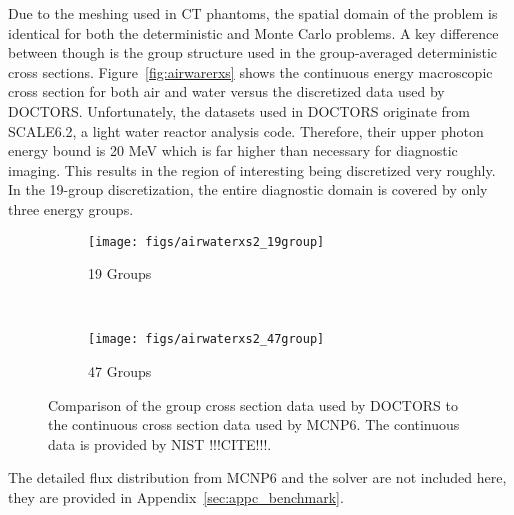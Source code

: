 Due to the meshing used in CT phantoms, the spatial domain of the problem is identical for both the deterministic and Monte Carlo problems. A key difference between though is the group structure used in the group-averaged deterministic cross sections. Figure~\ref{fig:airwarerxs} shows the continuous energy macroscopic cross section for both air and water versus the discretized data used by DOCTORS. Unfortunately, the datasets used in DOCTORS originate from SCALE6.2, a light water reactor analysis code. Therefore, their upper photon energy bound is 20 MeV which is far higher than necessary for diagnostic imaging. This results in the region of interesting being discretized very roughly. In the 19-group discretization, the entire diagnostic domain is covered by only three energy groups.

\begin{figure}
    \centering
    \begin{subfigure}[b]{0.45\textwidth}
        \texttt{[image: figs/airwaterxs2\_19group]}
        \caption{19 Groups}
        \label{fig:airwaterxs19}
    \end{subfigure}
    ~
    \begin{subfigure}[b]{0.45\textwidth}
        \texttt{[image: figs/airwaterxs2\_47group]}
        \caption{47 Groups}
        \label{fig:airwaterxs47}
    \end{subfigure}
    \caption{Comparison of the group cross section data used by DOCTORS to the continuous cross section data used by MCNP6. The continuous data is provided by NIST !!!CITE!!!.}\label{fig:airwaterxs}
\end{figure}


The detailed flux distribution from MCNP6 and the solver are not included here, they are provided in Appendix~\ref{sec:appc_benchmark}.


